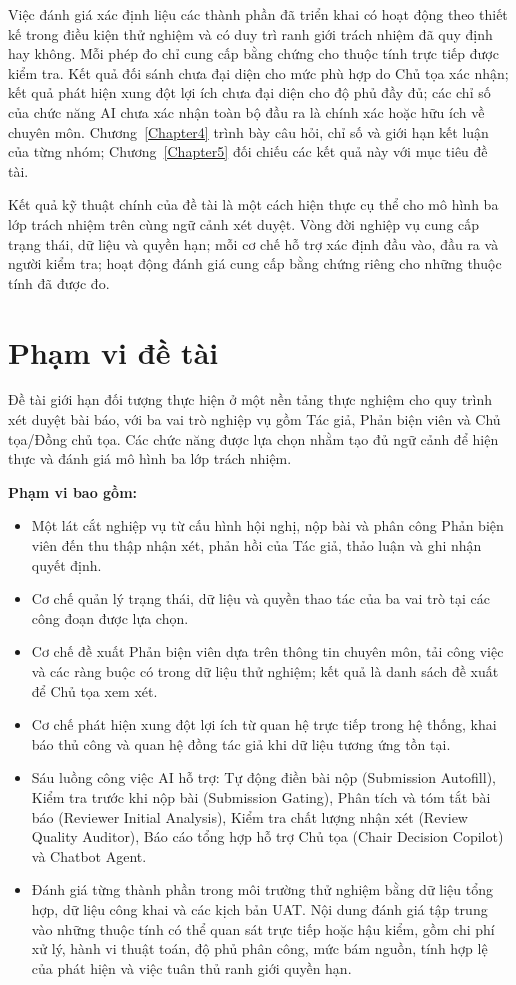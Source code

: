 Việc đánh giá xác định liệu các thành phần đã triển khai có hoạt động theo thiết kế trong điều kiện thử nghiệm và có duy trì ranh giới trách nhiệm đã quy định hay không. Mỗi phép đo chỉ cung cấp bằng chứng cho thuộc tính trực tiếp được kiểm tra. Kết quả đối sánh chưa đại diện cho mức phù hợp do Chủ tọa xác nhận; kết quả phát hiện xung đột lợi ích chưa đại diện cho độ phủ đầy đủ; các chỉ số của chức năng AI chưa xác nhận toàn bộ đầu ra là chính xác hoặc hữu ích về chuyên môn. Chương~\ref{Chapter4} trình bày câu hỏi, chỉ số và giới hạn kết luận của từng nhóm; Chương~\ref{Chapter5} đối chiếu các kết quả này với mục tiêu đề tài.

Kết quả kỹ thuật chính của đề tài là một cách hiện thực cụ thể cho mô hình ba lớp trách nhiệm trên cùng ngữ cảnh xét duyệt. Vòng đời nghiệp vụ cung cấp trạng thái, dữ liệu và quyền hạn; mỗi cơ chế hỗ trợ xác định đầu vào, đầu ra và người kiểm tra; hoạt động đánh giá cung cấp bằng chứng riêng cho những thuộc tính đã được đo.

\section{Phạm vi đề tài}

Đề tài giới hạn đối tượng thực hiện ở một nền tảng thực nghiệm cho quy trình xét duyệt bài báo, với ba vai trò nghiệp vụ gồm Tác giả, Phản biện viên và Chủ tọa/Đồng chủ tọa. Các chức năng được lựa chọn nhằm tạo đủ ngữ cảnh để hiện thực và đánh giá mô hình ba lớp trách nhiệm.

\textbf{Phạm vi bao gồm:}

\begin{itemize}
\item Một lát cắt nghiệp vụ từ cấu hình hội nghị, nộp bài và phân công Phản biện viên đến thu thập nhận xét, phản hồi của Tác giả, thảo luận và ghi nhận quyết định.
\item Cơ chế quản lý trạng thái, dữ liệu và quyền thao tác của ba vai trò tại các công đoạn được lựa chọn.
\item Cơ chế đề xuất Phản biện viên dựa trên thông tin chuyên môn, tải công việc và các ràng buộc có trong dữ liệu thử nghiệm; kết quả là danh sách đề xuất để Chủ tọa xem xét.
\item Cơ chế phát hiện xung đột lợi ích từ quan hệ trực tiếp trong hệ thống, khai báo thủ công và quan hệ đồng tác giả khi dữ liệu tương ứng tồn tại.
\item Sáu luồng công việc AI hỗ trợ: Tự động điền bài nộp (Submission Autofill), Kiểm tra trước khi nộp bài (Submission Gating), Phân tích và tóm tắt bài báo (Reviewer Initial Analysis), Kiểm tra chất lượng nhận xét (Review Quality Auditor), Báo cáo tổng hợp hỗ trợ Chủ tọa (Chair Decision Copilot) và Chatbot Agent.
\item Đánh giá từng thành phần trong môi trường thử nghiệm bằng dữ liệu tổng hợp, dữ liệu công khai và các kịch bản UAT. Nội dung đánh giá tập trung vào những thuộc tính có thể quan sát trực tiếp hoặc hậu kiểm, gồm chi phí xử lý, hành vi thuật toán, độ phủ phân công, mức bám nguồn, tính hợp lệ của phát hiện và việc tuân thủ ranh giới quyền hạn.
\end{itemize}

